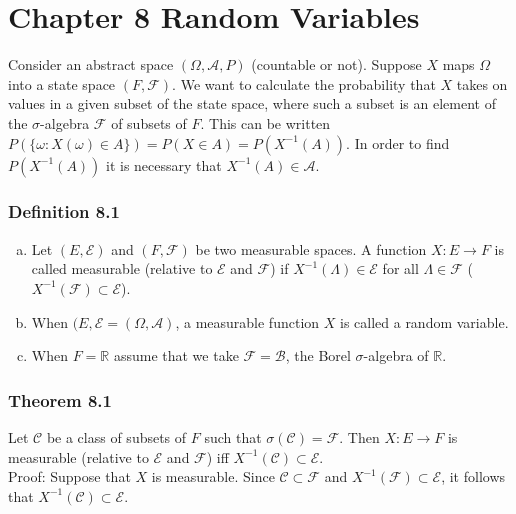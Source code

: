 \documentclass{article}
\begin{document}
{\newpage
\section*{Chapter 8 Random Variables}

Consider an abstract space $(\Omega, \mathcal{A}, P)$ (countable or not). Suppose $X$ maps $\Omega$ into a state space $(F, \mathcal{F})$. We want to calculate the probability that $X$ takes on values in a given subset of the state space, where such a subset is an element of the $\sigma$-algebra $\mathcal{F}$ of subsets of $F$. This can be written $P(\{\omega : X(\omega) \in A\}) = P(X \in A) = P(X^{-1}(A))$. In order to find $P(X^{-1}(A))$ it is necessary that $X^{-1}(A) \in \mathcal{A}$.

\subsubsection*{Definition 8.1}

\begin{enumerate}[a)]
\item Let $(E, \mathcal{E})$ and $(F, \mathcal{F})$ be two measurable spaces. A function $X : E \rightarrow F$ is called measurable (relative to $\mathcal{E}$ and $\mathcal{F}$) if $X^{-1}(\Lambda) \in \mathcal{E}$ for all $\Lambda \in \mathcal{F}$ ($X^{-1}(\mathcal{F}) \subset \mathcal{E}$).

\item When $(E, \mathcal{E} = (\Omega, \mathcal{A})$, a measurable function $X$ is called a random variable. 

\item When $F = \mathbb{R}$ assume that we take $\mathcal{F} = \mathcal{B}$, the Borel $\sigma$-algebra of $\mathbb{R}$.
\end{enumerate} 

\subsubsection*{Theorem 8.1}

Let $\mathcal{C}$ be a class of subsets of $F$ such that $\sigma(\mathcal{C}) = \mathcal{F}$. Then $X : E \rightarrow F$ is measurable (relative to $\mathcal{E}$ and $\mathcal{F}$) iff $X^{-1}(\mathcal{C}) \subset \mathcal{E}$. \\

Proof: Suppose that $X$ is measurable. Since $\mathcal{C} \subset \mathcal{F}$ and $X^{-1}(\mathcal{F}) \subset \mathcal{E}$, it follows that $X^{-1}(\mathcal{C}) \subset \mathcal{E}$. \\

}
\end{document}
